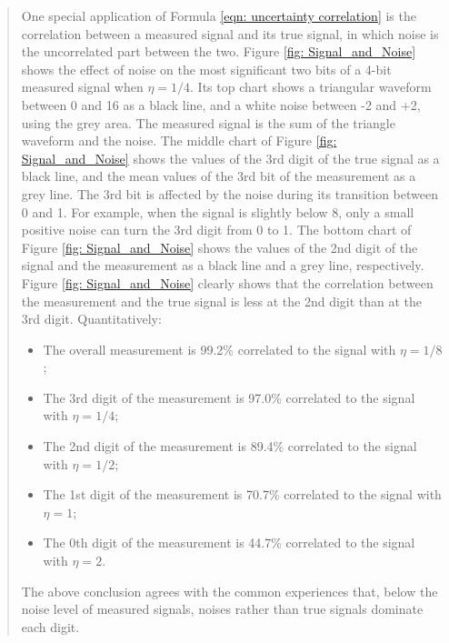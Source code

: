 \documentclass[twoside]{article}
\numberwithin{equation}{section}
\begin{document}
\begin{quotation}
One special application of Formula \eqref{eqn: uncertainty correlation} is the correlation between a measured signal and its true signal, in which noise is the uncorrelated part between the two.  
Figure \ref{fig: Signal_and_Noise} shows the effect of noise on the most significant two bits of a 4-bit measured signal when $\eta=1/4$.  
Its top chart shows a triangular waveform between 0 and 16 as a black line, and a white noise between -2 and +2, using the grey area.  
The measured signal is the sum of the triangle waveform and the noise.  
The middle chart of Figure \ref{fig: Signal_and_Noise} shows the values of the 3rd digit of the true signal as a black line, and the mean values of the 3rd bit of the measurement as a grey line.  
The 3rd bit is affected by the noise during its transition between 0 and 1.  
For example, when the signal is slightly below 8, only a small positive noise can turn the 3rd digit from 0 to 1.  
The bottom chart of Figure \ref{fig: Signal_and_Noise} shows the values of the 2nd digit of the signal and the measurement as a black line and a grey line, respectively.  
Figure \ref{fig: Signal_and_Noise} clearly shows that the correlation between the measurement and the true signal is less at the 2nd digit than at the 3rd digit.  
Quantitatively:
\begin{itemize}
\item  The overall measurement is 99.2\% correlated to the signal with $\eta=1/8$;
\item  The 3rd digit of the measurement is 97.0\% correlated to the signal with $\eta=1/4$;
\item  The 2nd digit of the measurement is 89.4\% correlated to the signal with $\eta=1/2$;
\item  The 1st digit of the measurement is 70.7\% correlated to the signal with $\eta=1$;
\item  The 0th digit of the measurement is 44.7\% correlated to the signal with $\eta=2$.
\end{itemize}
The above conclusion agrees with the common experiences that, below the noise level of measured signals, noises rather than true signals dominate each digit.  


\end{quotation}
\end{document}
